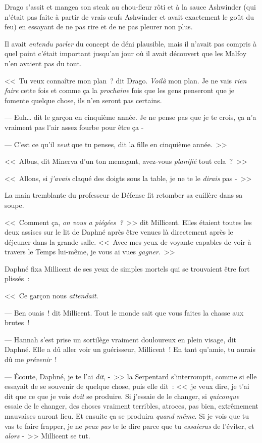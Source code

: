 \later

Drago s'assit et mangea son steak au chou-fleur rôti et à la sauce Ashwinder (qui n'était pas faite à partir de vrais œufs Ashwinder et avait exactement le goût du feu) en essayant de ne pas rire et de ne pas pleurer non plus.

Il avait \emph{entendu parler} du concept de déni plausible, mais il n'avait pas compris à quel point c'était important jusqu'au jour où il avait découvert que les Malfoy n'en avaient pas du tout.

<<~Tu veux connaître mon plan~? dit Drago. \emph{Voilà} mon plan. Je ne vais \emph{rien faire} cette fois et comme ça la \emph{prochaine} fois que les gens penseront que je fomente quelque chose, ils n'en seront pas certains.

--- Euh… dit le garçon en cinquième année. Je ne pense pas que je te crois, ça n'a vraiment pas l'air assez fourbe pour être ça -

--- C'est ce qu'il \emph{veut} que tu penses, dit la fille en cinquième année.~>>

\later

<<~Albus, dit Minerva d'un ton menaçant, avez-vous \emph{planifié} tout cela~?~>>

\later

<<~Allons, si \emph{j'avais} claqué des doigts sous la table, je ne te le \emph{dirais} pas -~>>

\later

La main tremblante du professeur de Défense fit retomber sa cuillère dans sa soupe.

\later

<<~Comment ça, \emph{on vous a piégées~?}~>> dit Millicent. Elles étaient toutes les deux assises sur le lit de Daphné après être venues là directement après le déjeuner dans la grande salle. <<~Avec mes yeux de voyante capables de voir à travers le Temps lui-même, je vous ai vues \emph{gagner}.~>>

Daphné fixa Millicent de ses yeux de simples mortels qui se trouvaient être fort plissés~:

<<~Ce garçon nous \emph{attendait}.

--- Ben ouais~! dit Millicent. Tout le monde sait que vous faites la chasse aux brutes~!

--- Hannah s'est prise un sortilège vraiment douloureux en plein visage, dit Daphné. Elle a dû aller voir un guérisseur, Millicent~! En tant qu'amie, tu aurais dû me \emph{prévenir}~!

--- Écoute, Daphné, je te l'ai \emph{dit}, -~>> la Serpentard s'interrompit, comme si elle essayait de se souvenir de quelque chose, puis elle dit~: <<~je veux dire, je t'ai dit que ce que je vois \emph{doit} se produire. Si j'essaie de le changer, si \emph{quiconque} essaie de le changer, des choses vraiment terribles, atroces, pas bien, extrêmement mauvaises auront lieu. Et ensuite ça se produira \emph{quand même}. Si je vois que tu vas te faire frapper, je ne \emph{peux pas} te le dire parce que tu \emph{essaieras} de l'éviter, et \emph{alors} -~>> Millicent se tut.

